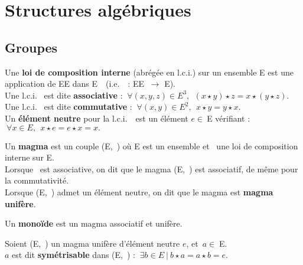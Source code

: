 

\section{Structures algébriques}

\vspace{1cm}

\subsection{Groupes}

\vspace{0.7cm}

Une \textbf{loi de composition interne} (abrégée en l.c.i.) sur un ensemble E est une application de E\x E dans E\ \ (i.e.\ \lci\, : E\x E \(\ \to\) E).\vspace{0.1cm} \\
Une l.c.i. \lci \ est dite \textbf{associative} \ssi : \(\ \forall (x,y,z)\in E^3,\ \ (x\star y)\star z = x\star (y\star z).\)\vspace{0.1cm} \\
Une l.c.i. \lci \ est dite \textbf{commutative} \ssi : \(\ \forall (x,y)\in E^2,\ \ x\star y = y\star x\).\vspace{0.1cm} \\
Un \textbf{élément neutre} pour la l.c.i. \lci \ \,est un élément \(e\in \ \)E vérifiant : \(\ \forall x\in E,\ \ x\star e= e\star x = x.\)

\vspace{1cm}

Un \textbf{magma} est un couple (E,\ \lci) où E est un ensemble et \lci \ une loi de composition interne sur E. \\
Lorsque \lci \ est associative, on dit que le magma (E,\ \lci) est associatif, de même pour la commutativité.\vspace{0.1cm} \\
Lorsque (E,\ \lci) admet un élément neutre, on dit que le magma est \textbf{magma unifère}.

\vspace{1cm}

Un \textbf{monoïde} est un magma associatif et unifère.

\vspace{1cm}

Soient (E,\ \lci) un magma unifère d'élément neutre $e$, et \(\,a \in \; \)E.\\
$a$ est dit \textbf{symétrisable} dans (E,\ \lci) \ssi : \(\ \exists b\in E \ | \ b\star a = a\star b = e.\)

